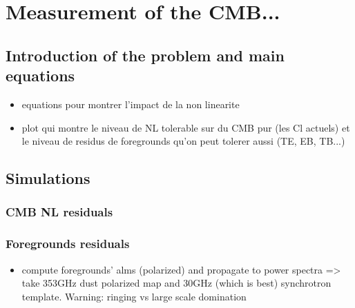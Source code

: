 
\section{Measurement of the CMB...}

\subsection{Introduction of the problem and main equations}
\begin{itemize}
\item equations pour montrer l'impact de la non linearite
\item plot qui montre le niveau de NL tolerable sur du CMB pur (les Cl actuels)
  et le niveau de residus de foregrounds qu'on peut tolerer aussi (TE, EB, TB...)
\end{itemize}

\subsection{Simulations}
\subsubsection{CMB NL residuals}

\subsubsection{Foregrounds residuals}

\begin{itemize}
\item compute foregrounds' alms (polarized) and propagate to power spectra =>
  take 353GHz dust polarized map and 30GHz (which is best) synchrotron
  template. Warning: ringing vs large scale domination
\end{itemize}
